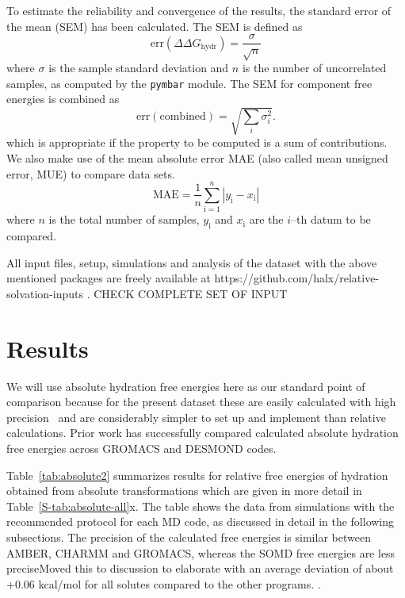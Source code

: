 \documentclass[journal=jctcce,manuscript=article]{achemso}
\begin{document}
To estimate the reliability and convergence of the results, the
standard error of the mean (SEM) has been calculated.  The SEM is
defined as
\begin{equation}
  \label{eq:sem}
  \mathrm{err}(\Delta\Delta G_{\mathrm{hydr}}) = \frac{\sigma}{\sqrt{n}}
\end{equation}
where $\sigma$ is the sample standard deviation and $n$ is the number of uncorrelated samples, as computed by the \texttt{pymbar} module.
  The SEM for component free energies is combined as
\begin{equation}
  \label{eq:sem-comb}
  \mathrm{err}(\mathrm{combined}) = \sqrt{\sum_i \sigma_i^2}.
\end{equation}
which is appropriate if the property to be computed is a sum of
contributions.
We also make use of the mean absolute error MAE (also called mean unsigned
error, MUE) to compare data sets.
\begin{equation}
\label{eq:MUE}
\mathrm{MAE} = \frac{1}{n}\sum_\mathrm{i=1}^n \left | y_\mathrm{i} -
x_\mathrm{i} \right |
\end{equation}
where $n$ is the total number of samples, $y_\mathrm{i}$ and $x_\mathrm{i}$ are
the $i$--th datum to be compared.

All input files, setup, simulations and analysis of the dataset with the above mentioned packages are freely available at
https://github.com/halx/relative-solvation-inputs .
{\color{red} CHECK COMPLETE SET OF INPUT}


\section{Results}
\label{sec:results}

We will use absolute hydration free energies here as our standard point of comparison because for the present dataset these are easily calculated with high precision~\cite{doi:10.1021/acs.jced.7b00104} %
and are considerably simpler to set up and implement than relative calculations.
Prior work has successfully compared calculated absolute hydration
free energies across GROMACS and DESMOND codes.~\cite{klimovich_predicting_2010}

Table~\ref{tab:absolute2} summarizes results for relative free energies of
hydration obtained from absolute transformations which are given in more detail in Table~\ref{S-tab:absolute-all}x.  The table shows the data
from simulations with the recommended protocol for each MD code, as
discussed in detail in the following subsections.
The  precision of the calculated free energies is similar between
AMBER, CHARMM and GROMACS, whereas the SOMD free energies are less
precise{\color{red}Moved this to discussion to elaborate}{\color{blue}
with an average deviation of about +0.06 kcal/mol for all solutes compared to the other programs.
}.
\end{document}
